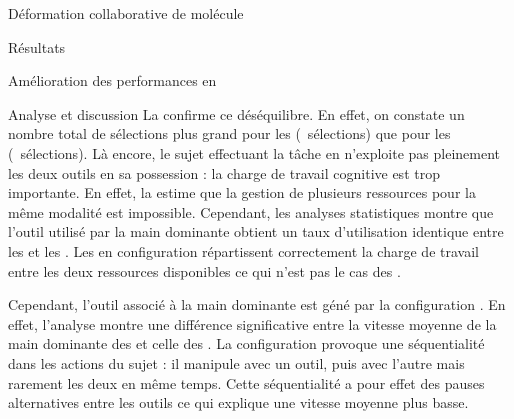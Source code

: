 \documentclass[myfrancais]{mythesis}
\begin{document}
\begin{mychapter}{Déformation collaborative de molécule}
\begin{mysection}{Résultats}
\begin{mysubsection}{Amélioration des performances en }
\begin{mysubsubsection}{Analyse et discussion}
					La  confirme ce déséquilibre.
					En effet, on constate un nombre total de sélections plus grand pour les  (~sélections) que pour les  (~sélections).
					Là encore, le sujet effectuant la tâche en  n'exploite pas pleinement les deux outils en sa possession : la charge de travail cognitive est trop importante.
					En effet, la   estime que la gestion de plusieurs ressources pour la même modalité est impossible.
					Cependant, les analyses statistiques montre que l'outil utilisé par la main dominante obtient un taux d'utilisation identique entre les  et les .
					Les  en configuration  répartissent correctement la charge de travail entre les deux ressources disponibles ce qui n'est pas le cas des .

					Cependant, l'outil associé à la main dominante est géné par la configuration .
					En effet, l'analyse montre une différence significative entre la vitesse moyenne de la main dominante des  et celle des .
					La configuration  provoque une séquentialité dans les actions du sujet : il manipule avec un outil, puis avec l'autre mais rarement les deux en même temps.
					Cette séquentialité a pour effet des pauses alternatives entre les outils ce qui explique une vitesse moyenne plus basse.


\end{mysubsubsection}
\end{mysubsection}
\end{mysection}
\end{mychapter}
\end{document}
